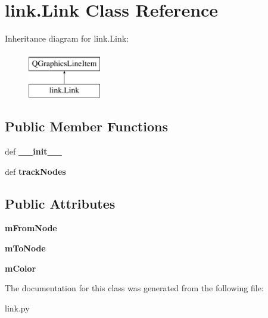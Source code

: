 \hypertarget{classlink_1_1Link}{\section{link.\-Link Class Reference}
\label{classlink_1_1Link}
}
Inheritance diagram for link.\-Link\-:\begin{figure}[H]
\begin{center}
\leavevmode
\includegraphics[height=2.000000cm]{classlink_1_1Link}
\end{center}
\end{figure}
\subsection*{Public Member Functions}
\begin{DoxyCompactItemize}
\item 
\hypertarget{classlink_1_1Link_acdbff907f2417cd450ed495b9e698f12}{def {\bfseries \-\_\-\-\_\-init\-\_\-\-\_\-}}\label{classlink_1_1Link_acdbff907f2417cd450ed495b9e698f12}

\item 
\hypertarget{classlink_1_1Link_a75f86c6fb6811895910b4bd467ce5b62}{def {\bfseries track\-Nodes}}\label{classlink_1_1Link_a75f86c6fb6811895910b4bd467ce5b62}

\end{DoxyCompactItemize}
\subsection*{Public Attributes}
\begin{DoxyCompactItemize}
\item 
\hypertarget{classlink_1_1Link_abff4e7f66578f35b5da709f44f7e0f50}{{\bfseries m\-From\-Node}}\label{classlink_1_1Link_abff4e7f66578f35b5da709f44f7e0f50}

\item 
\hypertarget{classlink_1_1Link_a92da705e81581bf06bb328779574fd12}{{\bfseries m\-To\-Node}}\label{classlink_1_1Link_a92da705e81581bf06bb328779574fd12}

\item 
\hypertarget{classlink_1_1Link_a5b907d6fd4e79f56e3a004e88b64dd7f}{{\bfseries m\-Color}}\label{classlink_1_1Link_a5b907d6fd4e79f56e3a004e88b64dd7f}

\end{DoxyCompactItemize}


The documentation for this class was generated from the following file\-:\begin{DoxyCompactItemize}
\item 
link.\-py\end{DoxyCompactItemize}
